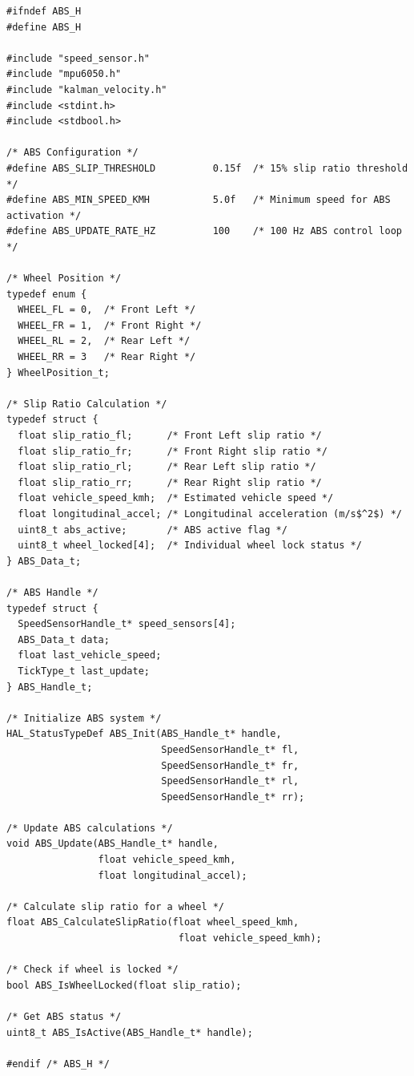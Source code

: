 \documentclass[11pt,a4paper]{article}
\begin{document}
\begin{lstlisting}[caption=ABS System Header, label=lst:absh]
#ifndef ABS_H
#define ABS_H

#include "speed_sensor.h"
#include "mpu6050.h"
#include "kalman_velocity.h"
#include <stdint.h>
#include <stdbool.h>

/* ABS Configuration */
#define ABS_SLIP_THRESHOLD          0.15f  /* 15% slip ratio threshold */
#define ABS_MIN_SPEED_KMH           5.0f   /* Minimum speed for ABS activation */
#define ABS_UPDATE_RATE_HZ          100    /* 100 Hz ABS control loop */

/* Wheel Position */
typedef enum {
  WHEEL_FL = 0,  /* Front Left */
  WHEEL_FR = 1,  /* Front Right */
  WHEEL_RL = 2,  /* Rear Left */
  WHEEL_RR = 3   /* Rear Right */
} WheelPosition_t;

/* Slip Ratio Calculation */
typedef struct {
  float slip_ratio_fl;      /* Front Left slip ratio */
  float slip_ratio_fr;      /* Front Right slip ratio */
  float slip_ratio_rl;      /* Rear Left slip ratio */
  float slip_ratio_rr;      /* Rear Right slip ratio */
  float vehicle_speed_kmh;  /* Estimated vehicle speed */
  float longitudinal_accel; /* Longitudinal acceleration (m/s$^2$) */
  uint8_t abs_active;       /* ABS active flag */
  uint8_t wheel_locked[4];  /* Individual wheel lock status */
} ABS_Data_t;

/* ABS Handle */
typedef struct {
  SpeedSensorHandle_t* speed_sensors[4];
  ABS_Data_t data;
  float last_vehicle_speed;
  TickType_t last_update;
} ABS_Handle_t;

/* Initialize ABS system */
HAL_StatusTypeDef ABS_Init(ABS_Handle_t* handle, 
                           SpeedSensorHandle_t* fl,
                           SpeedSensorHandle_t* fr,
                           SpeedSensorHandle_t* rl,
                           SpeedSensorHandle_t* rr);

/* Update ABS calculations */
void ABS_Update(ABS_Handle_t* handle, 
                float vehicle_speed_kmh,
                float longitudinal_accel);

/* Calculate slip ratio for a wheel */
float ABS_CalculateSlipRatio(float wheel_speed_kmh, 
                              float vehicle_speed_kmh);

/* Check if wheel is locked */
bool ABS_IsWheelLocked(float slip_ratio);

/* Get ABS status */
uint8_t ABS_IsActive(ABS_Handle_t* handle);

#endif /* ABS_H */
\end{lstlisting}
\end{document}
